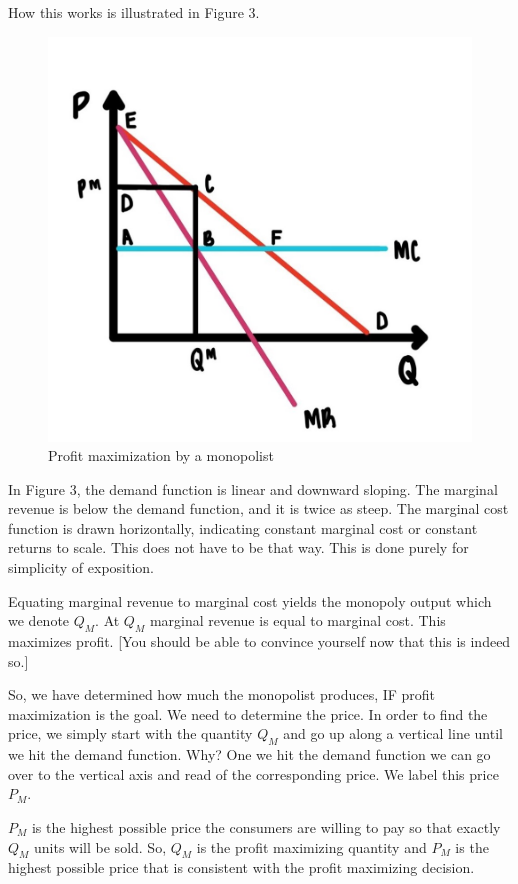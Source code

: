 \documentclass[
]{book}
\begin{document}
How this works is illustrated in Figure 3.

\begin{figure}

{\centering \includegraphics[width=0.75\linewidth]{img/monopoly/fig3} 

}

\caption{Profit maximization by a monopolist}\label{fig:monopoly03}
\end{figure}

In Figure 3, the demand function is linear and downward sloping. The marginal revenue is below the demand function, and it is twice as steep. The marginal cost function is drawn horizontally, indicating constant marginal cost or constant returns to scale. This does not have to be that way. This is done purely for simplicity of exposition.

Equating marginal revenue to marginal cost yields the monopoly output which we denote \(Q_M\). At \(Q_M\) marginal revenue is equal to marginal cost. This maximizes profit. {[}You should be able to convince yourself now that this is indeed so.{]}

So, we have determined how much the monopolist produces, IF profit maximization is the goal. We need to determine the price. In order to find the price, we simply start with the quantity \(Q_M\) and go up along a vertical line until we hit the demand function. Why? One we hit the demand function we can go over to the vertical axis and read of the corresponding price. We label this price \(P_M\).

\(P_M\) is the highest possible price the consumers are willing to pay so that exactly \(Q_M\) units will be sold. So, \(Q_M\) is the profit maximizing quantity and \(P_M\) is the highest possible price that is consistent with the profit maximizing decision.
\end{document}
